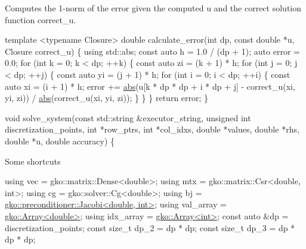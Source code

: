Computes the 1-\/norm of the error given the computed {\ttfamily u} and the correct solution function {\ttfamily correct\+\_\+u}.


\begin{DoxyCode}
\textcolor{keyword}{template} <\textcolor{keyword}{typename} Closure>
\textcolor{keywordtype}{double} calculate\_error(\textcolor{keywordtype}{int} dp, \textcolor{keyword}{const} \textcolor{keywordtype}{double} *u, Closure correct\_u)
\{
    \textcolor{keyword}{using} std::abs;
    \textcolor{keyword}{const} \textcolor{keyword}{auto} h = 1.0 / (dp + 1);
    \textcolor{keyword}{auto} error = 0.0;
    \textcolor{keywordflow}{for} (\textcolor{keywordtype}{int} k = 0; k < dp; ++k) \{
        \textcolor{keyword}{const} \textcolor{keyword}{auto} zi = (k + 1) * h;
        \textcolor{keywordflow}{for} (\textcolor{keywordtype}{int} j = 0; j < dp; ++j) \{
            \textcolor{keyword}{const} \textcolor{keyword}{auto} yi = (j + 1) * h;
            \textcolor{keywordflow}{for} (\textcolor{keywordtype}{int} i = 0; i < dp; ++i) \{
                \textcolor{keyword}{const} \textcolor{keyword}{auto} xi = (i + 1) * h;
                error +=
                    \hyperlink{namespacegko_a57797fc0a00fd4b7ff34ca4bfc84bc51}{abs}(u[k * dp * dp + i * dp + j] - correct\_u(xi, yi, zi)) /
                    \hyperlink{namespacegko_a57797fc0a00fd4b7ff34ca4bfc84bc51}{abs}(correct\_u(xi, yi, zi));
            \}
        \}
    \}
    \textcolor{keywordflow}{return} error;
\}


\textcolor{keywordtype}{void} solve\_system(\textcolor{keyword}{const} std::string &executor\_string,
                  \textcolor{keywordtype}{unsigned} \textcolor{keywordtype}{int} discretization\_points, \textcolor{keywordtype}{int} *row\_ptrs,
                  \textcolor{keywordtype}{int} *col\_idxs, \textcolor{keywordtype}{double} *values, \textcolor{keywordtype}{double} *rhs, \textcolor{keywordtype}{double} *u,
                  \textcolor{keywordtype}{double} accuracy)
\{
\end{DoxyCode}


Some shortcuts


\begin{DoxyCode}
\textcolor{keyword}{using} vec = gko::matrix::Dense<double>;
\textcolor{keyword}{using} mtx = gko::matrix::Csr<double, int>;
\textcolor{keyword}{using} cg = gko::solver::Cg<double>;
\textcolor{keyword}{using} bj = \hyperlink{classgko_1_1preconditioner_1_1Jacobi}{gko::preconditioner::Jacobi<double, int>};
\textcolor{keyword}{using} val\_array = \hyperlink{classgko_1_1Array}{gko::Array<double>};
\textcolor{keyword}{using} idx\_array = \hyperlink{classgko_1_1Array}{gko::Array<int>};
\textcolor{keyword}{const} \textcolor{keyword}{auto} &dp = discretization\_points;
\textcolor{keyword}{const} \textcolor{keywordtype}{size\_t} dp\_2 = dp * dp;
\textcolor{keyword}{const} \textcolor{keywordtype}{size\_t} dp\_3 = dp * dp * dp;
\end{DoxyCode}


